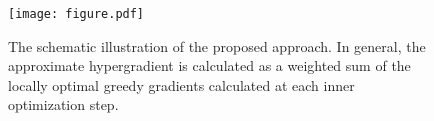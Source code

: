 \begin{figure}[h]
    \centering
    \label{fig:hypergrad}
    \small
    \texttt{[image: figure.pdf]}
\caption{The schematic illustration of the proposed approach. In general, the approximate hypergradient is calculated as a weighted sum of the locally optimal greedy gradients calculated at each inner optimization step.}
\end{figure}


